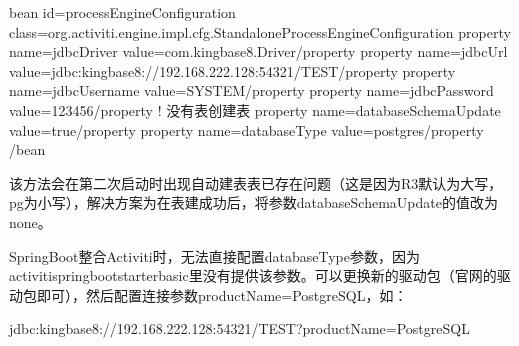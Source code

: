 \documentclass[a4,10pt,oneside,english]{sphinxmanual}
\begin{document}
\begin{sphinxVerbatim}[commandchars=\\\{\}]
\PYGZlt{}bean id=\PYGZdq{}processEngineConfiguration\PYGZdq{} class=\PYGZdq{}org.activiti.engine.impl.cfg.StandaloneProcessEngineConfiguration\PYGZdq{}\PYGZgt{}
        \PYGZlt{}property name=\PYGZdq{}jdbcDriver\PYGZdq{} value=\PYGZdq{}com.kingbase8.Driver\PYGZdq{}\PYGZgt{}\PYGZlt{}/property\PYGZgt{}
        \PYGZlt{}property name=\PYGZdq{}jdbcUrl\PYGZdq{} value=\PYGZdq{}jdbc:kingbase8://192.168.222.128:54321/TEST\PYGZdq{}\PYGZgt{}\PYGZlt{}/property\PYGZgt{}
        \PYGZlt{}property name=\PYGZdq{}jdbcUsername\PYGZdq{} value=\PYGZdq{}SYSTEM\PYGZdq{}\PYGZgt{}\PYGZlt{}/property\PYGZgt{}
        \PYGZlt{}property name=\PYGZdq{}jdbcPassword\PYGZdq{} value=\PYGZdq{}123456\PYGZdq{}\PYGZgt{}\PYGZlt{}/property\PYGZgt{}
        \PYGZlt{}!\PYGZhy{}\PYGZhy{} 没有表创建表 \PYGZhy{}\PYGZhy{}\PYGZgt{}
        \PYGZlt{}property name=\PYGZdq{}databaseSchemaUpdate\PYGZdq{} value=\PYGZdq{}true\PYGZdq{}\PYGZgt{}\PYGZlt{}/property\PYGZgt{}
        \PYGZlt{}property name=\PYGZdq{}databaseType\PYGZdq{} value=\PYGZdq{}postgres\PYGZdq{}\PYGZgt{}\PYGZlt{}/property\PYGZgt{}
 \PYGZlt{}/bean\PYGZgt{}
\end{sphinxVerbatim}

该方法会在第二次启动时出现自动建表表已存在问题（这是因为R3默认为大写，pg为小写），解决方案为在表建成功后，将参数databaseSchemaUpdate的值改为none。

\begin{sphinxVerbatim}[commandchars=\\\{\}]
  
\end{sphinxVerbatim}

SpringBoot整合Activiti时，无法直接配置databaseType参数，因为activiti\sphinxhyphen{}spring\sphinxhyphen{}boot\sphinxhyphen{}starter\sphinxhyphen{}basic里没有提供该参数。可以更换新的驱动包（官网的驱动包即可），然后配置连接参数productName=PostgreSQL，如：

\begin{sphinxVerbatim}[commandchars=\\\{\}]
jdbc:kingbase8://192.168.222.128:54321/TEST?productName=PostgreSQL
\end{sphinxVerbatim}
\end{document}

